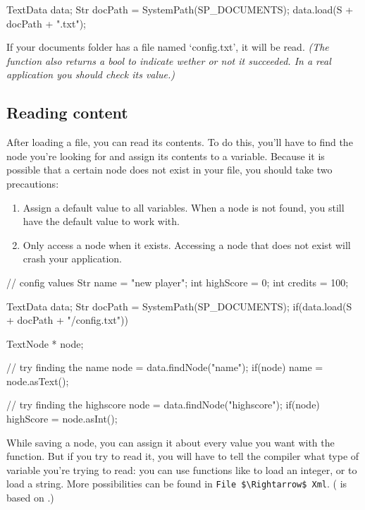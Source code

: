 \begin{code}
TextData data;
Str docPath = SystemPath(SP_DOCUMENTS);
data.load(S + docPath + "\config.txt");
\end{code}

If your documents folder has a file named `config.txt', it will be read. \textsl{(The function also returns a bool to indicate wether or not it succeeded. In a real application you should check its value.)}

\subsection{Reading content}
After loading a file, you can read its contents. To do this, you'll have to find the node you're looking for and assign its contents to a variable. Because it is possible that a certain node does not exist in your file, you should take two precautions:

\begin{enumerate}
	\item Assign a default value to all variables. When a node is not found, you still have the default value to work with.
	\item Only access a node when it exists. Accessing a node that does not exist will crash your application.
\end{enumerate}

\begin{code}
// config values
Str name = "new player";
int highScore = 0;
int credits = 100;

TextData data;
Str docPath = SystemPath(SP_DOCUMENTS);
if(data.load(S + docPath + "/config.txt")) {
   TextNode * node;
	 
	 // try finding the name
	 node = data.findNode("name");
	 if(node) {
	    name = node.asText();
	 }
	 
	 // try finding the highscore
	 node = data.findNode("highscore");
	 if(node) {
	    highScore = node.asInt();
	 }
}
\end{code}

\begin{note}
While saving a node, you can assign it about every value you want with the function. But if you try to read it, you will have to tell the compiler what type of variable you're trying to read: you can use functions like  to load an integer, or  to load a string. More possibilities can be found in \verb|File $\Rightarrow$ Xml|. ( is based on .)
\end{note}


